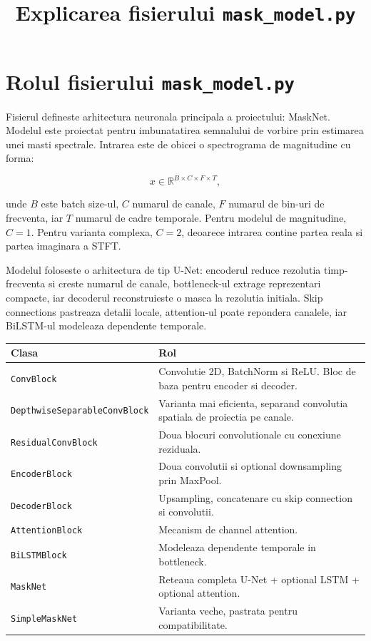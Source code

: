 \documentclass[12pt,a4paper]{report}
\title{Explicarea fisierului \texttt{mask\_model.py}}
\author{}
\date{}
\begin{document}
\maketitle
\tableofcontents
\clearpage

\chapter{Rolul fisierului \texttt{mask\_model.py}}

Fisierul  defineste arhitectura neuronala principala
a proiectului: MaskNet. Modelul este proiectat pentru imbunatatirea semnalului
de vorbire prin estimarea unei masti spectrale. Intrarea este de obicei o
spectrograma de magnitudine cu forma:

\[
x \in \mathbb{R}^{B \times C \times F \times T},
\]

unde \(B\) este batch size-ul, \(C\) numarul de canale, \(F\) numarul de bin-uri
de frecventa, iar \(T\) numarul de cadre temporale. Pentru modelul de magnitudine,
\(C=1\). Pentru varianta complexa, \(C=2\), deoarece intrarea contine partea
reala si partea imaginara a STFT.

Modelul foloseste o arhitectura de tip U-Net: encoderul reduce rezolutia
timp-frecventa si creste numarul de canale, bottleneck-ul extrage reprezentari
compacte, iar decoderul reconstruieste o masca la rezolutia initiala. Skip
connections pastreaza detalii locale, attention-ul poate repondera canalele, iar
BiLSTM-ul modeleaza dependente temporale.

\begin{longtable}{p{}p{}}
\toprule
\textbf{Clasa} & \textbf{Rol} \\
\midrule
\endhead
\texttt{ConvBlock} & Convolutie 2D, BatchNorm si ReLU. Bloc de baza pentru encoder
si decoder. \\
\texttt{DepthwiseSeparableConvBlock} & Varianta mai eficienta, separand convolutia
spatiala de proiectia pe canale. \\
\texttt{ResidualConvBlock} & Doua blocuri convolutionale cu conexiune reziduala. \\
\texttt{EncoderBlock} & Doua convolutii si optional downsampling prin MaxPool. \\
\texttt{DecoderBlock} & Upsampling, concatenare cu skip connection si convolutii. \\
\texttt{AttentionBlock} & Mecanism de channel attention. \\
\texttt{BiLSTMBlock} & Modeleaza dependente temporale in bottleneck. \\
\texttt{MaskNet} & Reteaua completa U-Net + optional LSTM + optional attention. \\
\texttt{SimpleMaskNet} & Varianta veche, pastrata pentru compatibilitate. \\
\bottomrule
\end{longtable}
\end{document}
